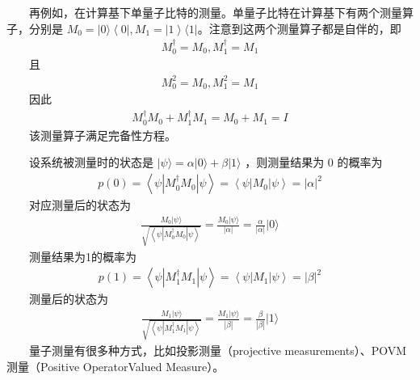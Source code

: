 \documentclass[a4paper,11pt,english]{sphinxmanual}
\begin{document}
\sphinxAtStartPar
  再例如，在计算基下单量子比特的测量。单量子比特在计算基下有两个测量算子，分别是 \(M_{0}=|0\rangle\left\langle 0\left|, M_{1}=\right| 1\right\rangle\langle 1|\) ​。注意到这两个测量算子都是自伴的，即
\begin{equation*}
\begin{split}M_{0}^{\dagger}=M_{0}, M_{1}^{\dagger}=M_{1}\end{split}
\end{equation*}
\sphinxAtStartPar
  且
\begin{equation*}
\begin{split}M_{0}^{2}=M_{0}, M_{1}^{2}=M_{1}\end{split}
\end{equation*}
\sphinxAtStartPar
  因此
\begin{equation*}
\begin{split}M_{0}^{\dagger} M_{0}+M_{1}^{\dagger} M_{1}=M_{0}+M_{1}=I\end{split}
\end{equation*}
\sphinxAtStartPar
  该测量算子满足完备性方程。

\sphinxAtStartPar
  设系统被测量时的状态是 \(|\psi\rangle=\alpha|0\rangle+\beta|1\rangle\) ，则测量结果为 \(0\) 的概率为
\begin{equation*}
\begin{split}p(0)=\left\langle\psi\left|M_{0}^{\dagger} M_{0}\right| \psi\right\rangle=\left\langle\psi\left|M_{0}\right| \psi\right\rangle=|\alpha|^{2}\end{split}
\end{equation*}
\sphinxAtStartPar
  对应测量后的状态为
\begin{equation*}
\begin{split}\frac{M_{0}|\psi\rangle}{\sqrt{\left\langle\psi\left|M_{0}^{\dagger} M_{0}\right| \psi\right\rangle}}=\frac{M_{0}|\psi\rangle}{|\alpha|}=\frac{\alpha}{|\alpha|}|0\rangle\end{split}
\end{equation*}
\sphinxAtStartPar
  测量结果为1的概率为
\begin{equation*}
\begin{split}p(1)=\left\langle\psi\left|M_{1}^{\dagger} M_{1}\right| \psi\right\rangle=\left\langle\psi\left|M_{1}\right| \psi\right\rangle=|\beta|^{2}\end{split}
\end{equation*}
\sphinxAtStartPar
  测量后的状态为
\begin{equation*}
\begin{split}\frac{M_{1}|\psi\rangle}{\sqrt{\left\langle\psi\left|M_{1}^{\dagger} M_{1}\right| \psi\right\rangle}}=\frac{M_{1}|\psi\rangle}{|\beta|}=\frac{\beta}{|\beta|}|1\rangle\end{split}
\end{equation*}
\sphinxAtStartPar
  量子测量有很多种方式，比如投影测量（projective measurements）、POVM测量（Positive Operator\sphinxhyphen{}Valued Measure）。
\end{document}
